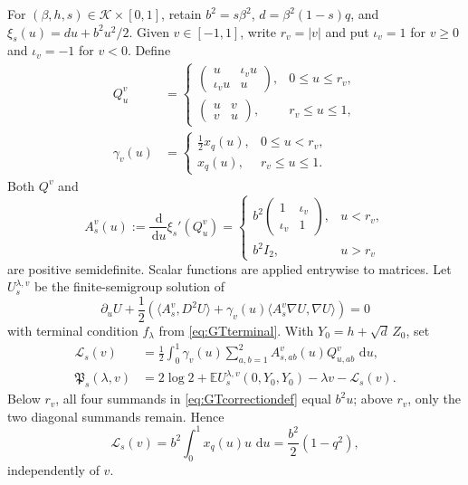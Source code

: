 \documentclass[11pt]{article}
\numberwithin{equation}{section}
\theoremstyle{plain}
\theoremstyle{definition}
\newcommand{\E}{\mathbb E}
\newcommand{\1}{\mathbf 1}
\newcommand{\cK}{\mathcal K}
\newcommand{\dd}{\,\mathrm d}
\begin{document}
For $(\beta,h,s)\in\cK\times[0,1]$, retain
$b^2=s\beta^2$, $d=\beta^2(1-s)q$, and
$\xi_s(u)=du+b^2u^2/2$.  Given $v\in[-1,1]$, write $r_v=|v|$ and put
$\iota_v=1$ for $v\ge0$ and $\iota_v=-1$ for $v<0$.  Define
\begin{align}
 Q^v_u
 &=
 \begin{cases}
  \begin{pmatrix}u&\iota_vu\\ \iota_vu&u\end{pmatrix},
       &0\le u\le r_v,\\[2mm]
  \begin{pmatrix}u&v\\v&u\end{pmatrix},
       &r_v\le u\le1,
 \end{cases}
 \label{eq:GTpath}\\
 \gamma_v(u)
 &=
 \begin{cases}
  \frac12x_q(u),&0\le u<r_v,\\
  x_q(u),&r_v\le u\le1.
 \end{cases}
 \label{eq:halfparameter}
\end{align}
Both $Q^v$ and
\begin{equation}
 A^v_s(u):=\frac{\dd}{\dd u}\xi_s'(Q^v_u)
 =
 \begin{cases}
 b^2\begin{pmatrix}1&\iota_v\\\iota_v&1\end{pmatrix},&u<r_v,\\[2mm]
 b^2I_2,&u>r_v
 \end{cases}
 \label{eq:GTspeed}
\end{equation}
are positive semidefinite.  Scalar functions are applied entrywise to
matrices.  Let $U^{\lambda,v}_s$ be the finite-semigroup solution of
\begin{equation}
 \partial_uU+\frac12\left(
   \langle A^v_s,D^2U\rangle
   +\gamma_v(u)\langle A^v_s\nabla U,\nabla U\rangle
 \right)=0
 \label{eq:2DParisiPDE}
\end{equation}
with terminal condition $f_\lambda$ from \eqref{eq:GTterminal}.  With
$Y_0=h+\sqrt d\,Z_0$, set
\begin{align}
 \mathcal L_s(v)
 &=\frac12\int_0^1\gamma_v(u)
   \sum_{a,b=1}^2 A^v_{s,ab}(u)Q^v_{u,ab}\,\dd u,
 \label{eq:GTcorrectiondef}\\
 \mathfrak P_s(\lambda,v)
 &=2\log2+\E U^{\lambda,v}_s(0,Y_0,Y_0)
   -\lambda v-\mathcal L_s(v).
 \label{eq:GTfunctional}
\end{align}
Below $r_v$, all four summands in \eqref{eq:GTcorrectiondef} equal
$b^2u$; above $r_v$, only the two diagonal summands remain.  Hence
\begin{equation}
 \mathcal L_s(v)
 =b^2\int_0^1x_q(u)u\,\dd u
 =\frac{b^2}{2}(1-q^2),
 \label{eq:GTcorrection}
\end{equation}
independently of $v$.
\end{document}
